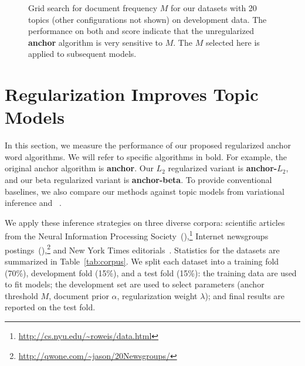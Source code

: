 
\begin{figure}[t]
\centering
{}
\caption{Grid search for document frequency $M$ for our datasets with
  20 topics (other configurations not shown) on development data. The
  performance on both  and  score indicate that the
  unregularized {\bf anchor} algorithm is very sensitive to $M$.  The
  $M$ selected here is applied to subsequent models.}
\label{fig:anchor-select}
\end{figure}



\section{Regularization Improves Topic Models}
\label{sec:experiments}

In this section, we measure the performance of our proposed
regularized anchor word algorithms.  We will refer to specific
algorithms in bold.  For example, the original anchor algorithm is
{\bf anchor}.  Our $L_2$ regularized variant is {\bf anchor-$L_2$},
and our beta regularized variant is {\bf anchor-beta}.  To provide
conventional baselines, we also compare our methods against topic
models from variational inference \cite[{\bf
  variational}]{blei-03} and ~\cite[{\bf
  }]{griffiths-04,mallet}.

We apply these inference strategies on three diverse corpora:
scientific articles from the Neural Information Processing
Society~(),\footnote{\url{http://cs.nyu.edu/~roweis/data.html}} Internet newsgroups
postings~(),\footnote{\url{http://qwone.com/~jason/20Newsgroups/}} and New York Times
editorials~\cite[]{sandhaus-08}.  Statistics for the datasets
are summarized in Table~\ref{tab:corpus}.  We split each dataset into
a training fold (70\%), development fold (15\%), and a test
fold (15\%): the training data are used to fit models; the development
set are used to select parameters (anchor threshold $M$, document
prior $\alpha$, regularization weight $\lambda$); and final results
are reported on the test fold.

